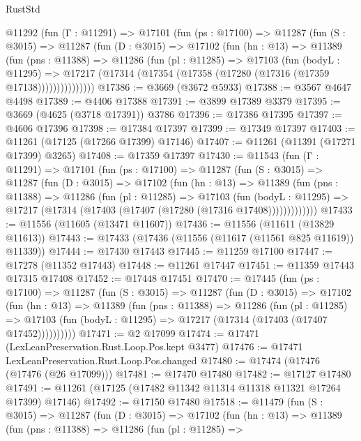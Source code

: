 \begin{lexlean}{RustStd}
\begin{coremodule}
    @11292
      (fun (Γ : @11291) =>
      @17101
        (fun (ps : @17100) =>
        @11287
          (fun (S : @3015) =>
          @11287
            (fun (D : @3015) =>
            @17102
              (fun (hn : @13) =>
              @11389
                (fun (pns : @11388) =>
                @11286
                  (fun (pl : @11285) =>
                  @17103
                    (fun (bodyL : @11295) =>
                    @17217 (@17314 (@17354 (@17358 (@17280 (@17316 (@17359 @17138)))))))))))))))
@17386 := @3669 (@3672 @5933)
@17388 := @3567 @4647 @4498
@17389 := @4406 @17388
@17391 := @3899 @17389 @3379
@17395 := @3669 (@4625 (@3718 @17391)) @3786
@17396 := @17386 @17395
@17397 := @4606 @17396
@17398 := @17384 @17397
@17399 := @17349 @17397
@17403 := @11261 (@17125 (@17266 @17399) @17146)
@17407 := @11261 (@11391 (@17271 @17399) @3265)
@17408 := @17359 @17397
@17430 := @11543
    (fun (Γ : @11291) =>
    @17101
      (fun (ps : @17100) =>
      @11287
        (fun (S : @3015) =>
        @11287
          (fun (D : @3015) =>
          @17102
            (fun (hn : @13) =>
            @11389
              (fun (pns : @11388) =>
              @11286
                (fun (pl : @11285) =>
                @17103
                  (fun (bodyL : @11295) =>
                  @17217 (@17314 (@17403 (@17407 (@17280 (@17316 @17408)))))))))))))
@17433 := @11556 (@11605 (@13471 @11607))
@17436 := @11556 (@11611 (@13829 @11613))
@17443 := @17433 (@17436 (@11556 (@11617 (@11561 @825 @11619)) @11339))
@17444 := @17430 @17443
@17445 := @11259 @17100
@17447 := @17278 (@11352 @17443)
@17448 := @11261 @17447
@17451 := @11359 @17443 @17315 @17408
@17452 := @17448 @17451
@17470 := @17445
    (fun (ps : @17100) =>
    @11287
      (fun (S : @3015) =>
      @11287
        (fun (D : @3015) =>
        @17102
          (fun (hn : @13) =>
          @11389
            (fun (pns : @11388) =>
            @11286
              (fun (pl : @11285) =>
              @17103 (fun (bodyL : @11295) => @17217 (@17314 (@17403 (@17407 @17452))))))))))
@17471 := @2 @17099
@17474 := @17471 (LexLeanPreservation.Rust.Loop.Pos.kept @3477)
@17476 := @17471 LexLeanPreservation.Rust.Loop.Pos.changed
@17480 := @17474 (@17476 (@17476 (@26 @17099)))
@17481 := @17470 @17480
@17482 := @17127 @17480
@17491 := @11261 (@17125 (@17482 @11342 @11314 @11318 @11321 @17264 @17399) @17146)
@17492 := @17150 @17480
@17518 := @11479
    (fun (S : @3015) =>
    @11287
      (fun (D : @3015) =>
      @17102
        (fun (hn : @13) =>
        @11389
          (fun (pns : @11388) =>
          @11286
            (fun (pl : @11285) =>

\end{coremodule}
\end{lexlean}
